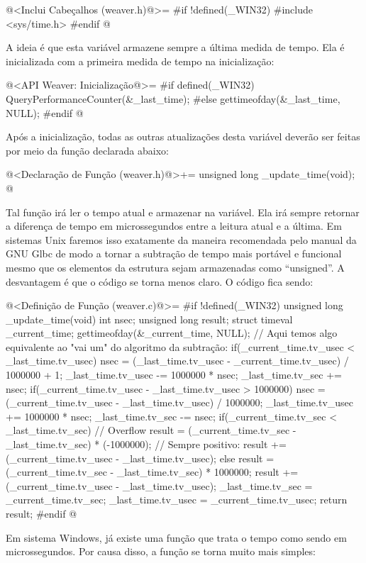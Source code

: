 \iniciocodigo
@<Inclui Cabeçalhos (weaver.h)@>=
#if !defined(_WIN32)
#include <sys/time.h>
#endif
@
\fimcodigo

A ideia é que esta variável armazene sempre a última medida de
tempo. Ela é inicializada com a primeira medida de tempo na
inicialização:

\iniciocodigo
@<API Weaver: Inicialização@>=
#if defined(_WIN32)
QueryPerformanceCounter(&_last_time);
#else
gettimeofday(&_last_time, NULL);
#endif
@
\fimcodigo

Após a inicialização, todas as outras atualizações desta variável
deverão ser feitas por meio da função declarada abaixo:

\iniciocodigo
@<Declaração de Função (weaver.h)@>+=
unsigned long _update_time(void);
@
\fimcodigo

Tal função irá ler o tempo atual e armazenar na variável. Ela irá
sempre retornar a diferença de tempo em microssegundos entre a leitura
atual e a última. Em sistemas Unix faremos isso exatamente da maneira
recomendada pelo manual da GNU Glbc de modo a tornar a subtração de
tempo mais portável e funcional mesmo que os elementos da
estrutura  sejam armazenadas como ``unsigned''.  A
desvantagem é que o código se torna menos claro. O código fica sendo:

\iniciocodigo
@<Definição de Função (weaver.c)@>=
#if !defined(_WIN32)
unsigned long _update_time(void){
  int nsec;
  unsigned long result;
  struct timeval _current_time;
  gettimeofday(&_current_time, NULL);
  // Aqui temos algo equivalente ao "vai um" do algoritmo da subtração:
  if(_current_time.tv_usec < _last_time.tv_usec){
    nsec = (_last_time.tv_usec - _current_time.tv_usec) / 1000000 + 1;
    _last_time.tv_usec -= 1000000 * nsec;
    _last_time.tv_sec += nsec;
  }
  if(_current_time.tv_usec - _last_time.tv_usec > 1000000){
    nsec = (_current_time.tv_usec - _last_time.tv_usec) / 1000000;
    _last_time.tv_usec += 1000000 * nsec;
    _last_time.tv_sec -= nsec;
  }
  if(_current_time.tv_sec < _last_time.tv_sec){
    // Overflow
    result = (_current_time.tv_sec - _last_time.tv_sec) * (-1000000);
    // Sempre positivo:
    result += (_current_time.tv_usec - _last_time.tv_usec);
  }
  else{
    result = (_current_time.tv_sec - _last_time.tv_sec) * 1000000;
    result += (_current_time.tv_usec - _last_time.tv_usec);
  }
  _last_time.tv_sec = _current_time.tv_sec;
  _last_time.tv_usec = _current_time.tv_usec;
  return result;
}
#endif
@
\fimcodigo

Em sistema Windows, já existe uma função que trata o tempo como sendo
em microssegundos. Por causa disso, a função se torna muito mais
simples:

